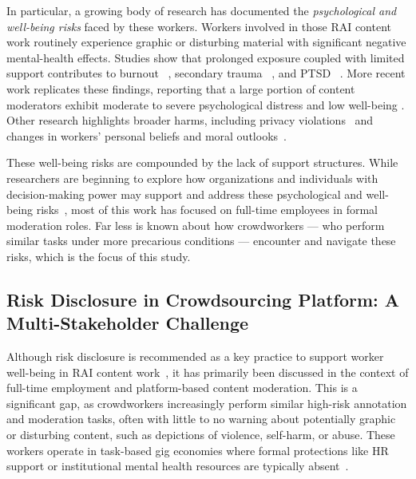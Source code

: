 In particular, a growing body of research has documented the \textit{psychological and well-being risks} faced by these workers. Workers involved in those RAI content work routinely experience graphic or disturbing material with significant negative mental-health effects.  Studies show that prolonged exposure coupled with limited support contributes to burnout ~\cite{dosono2019moderation}, secondary trauma ~\cite{martinez2024secondary}, and PTSD ~\cite{steiger_psychological_2021, alemadi2024emotional, Michel2018ExContentMS, ruckenstein_re-humanizing_2020, Dwoskin_2019, arsht_2018_human}. More recent work replicates these findings, reporting that a large portion of content moderators exhibit moderate to severe psychological distress and low well-being \cite{Spence2025ContentModeratorMentalHealth}. Other research highlights broader harms, including privacy violations~\cite{pinchevski2023social, schopke-gonzalez_why_2022} and changes in workers’ personal beliefs and moral outlooks~\cite{newton_trauma_2019, Stackpole_2022, Douek_2021}.

These well-being risks are compounded by the lack of support structures. While researchers are beginning to explore how organizations and individuals with decision-making power may support and address these psychological and well-being risks~\cite{qian2025aura, qian2025locating, steiger_psychological_2021, bharucha2023content}, most of this work has focused on full-time employees in formal moderation roles. Far less is known about how crowdworkers --- who perform similar tasks under more precarious conditions --- encounter and navigate these risks, which is the focus of this study.


\subsection{Risk Disclosure in Crowdsourcing Platform: A Multi-Stakeholder Challenge}
Although risk disclosure is recommended as a key practice to support worker well-being in RAI content work~\cite{bharucha2023content, qian2025aura}, it has primarily been discussed in the context of full-time employment and platform-based content moderation. This is a significant gap, as crowdworkers increasingly perform similar high-risk annotation and moderation tasks, often with little to no warning about potentially graphic or disturbing content, such as depictions of violence, self-harm, or abuse. These workers operate in task-based gig economies where formal protections like HR support or institutional mental health resources are typically absent~\cite{irani2013turkopticon, martin2014being, salehi2018ink, silberman2018responsible, toxtli2021quantifying, schlicher2021flexible}.

